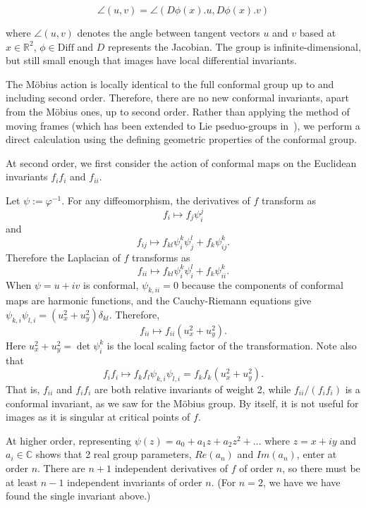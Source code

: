 \documentclass[review,onefignum,onetabnum]{siamonline190516}
\begin{document}
\begin{equation}
\angle (u,v) = \angle (D \phi(x) . u, D \phi(x).v)
\end{equation}

\noindent where $\angle(u, v)$ denotes the angle between tangent vectors
$u$ and $v$ based at $x \in \mathbb{R}^2$, $\phi \in \textrm{Diff}$ and $D$
represents the Jacobian. The group is infinite-dimensional, but still small
enough that images have local differential invariants.

The M\"obius action is locally identical to the full conformal group up to and including second order. Therefore, there are no new conformal invariants, apart from the M\"obius ones, up to second order. Rather than applying the method of moving frames (which has been extended to Lie pseduo-groups in~\cite{}), we perform a direct calculation using the defining geometric properties of the conformal group.

At second order, we first consider the action of conformal maps on the Euclidean invariants $f_i f_i$ and $f_{ii}$.

Let $\psi := \varphi^{-1}$. For any diffeomorphism, the derivatives of $f$ transform as
$$f_i \mapsto f_j \psi^j_i$$
and
$$f_{ij} \mapsto f_{kl} \psi^k_i\psi^l_j + f_{k}\psi^k_{ij}.$$
Therefore the Laplacian of $f$ transforms as
$$ f_{ii} \mapsto f_{kl} \psi^k_i \psi^l_i + f_k \psi^k_{ii}.$$
When $\psi=u + i v$ is conformal, $\psi_{k,ii}=0$ because the components of conformal maps are harmonic functions,
and the Cauchy-Riemann equations give $\psi_{k,i}\psi_{l,i} = (u_x^2 + u_y^2)\delta_{kl}$. Therefore,
$$ f_{ii} \mapsto f_{ii}(u_x^2+u_y^2).$$
Here $u_x^2+u_y^2=\det\psi^k_i$ is the local scaling factor of the transformation.
Note also that
$$f_i f_i \mapsto f_k f_l \psi_{k,i} \psi_{l,i} = f_k f_k (u_x^2 + u_y^2).$$
That is, $f_{ii}$ and $f_i f_i$ are both relative invariants of weight 2, while $f_{ii}/(f_i f_i)$ is a conformal invariant, as we saw for the M\"obius group. By itself, it is not useful for images as it is singular at critical points of $f$.

At higher order,  representing $\psi(z) = a_0 + a_1 z + a_2 z^2 + \dots$ where $z=x+iy$ and $a_i\in \mathbb{C}$ shows that 2 real group parameters, $Re(a_n)$ and $Im(a_n)$, enter at order $n$. There are $n+1$ independent derivatives of $f$ of order $n$, so there must be at least $n-1$ independent invariants of order $n$. (For $n=2$, we have we have found the single invariant above.)
\end{document}
